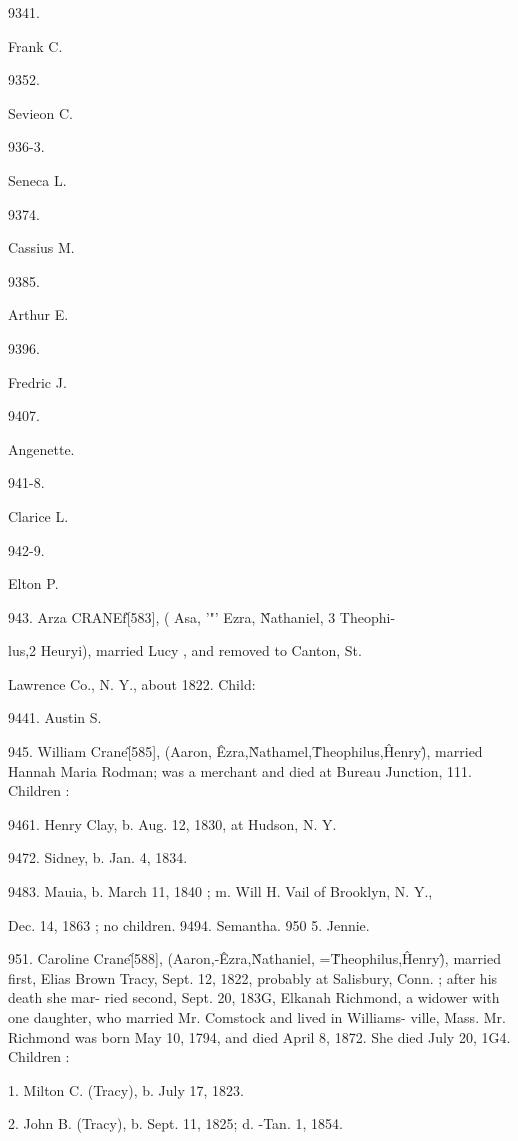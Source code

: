 9341. 


Frank C. 


9352. 


Sevieon C. 


936-3. 


Seneca L. 


9374. 


Cassius M. 


9385. 


Arthur E. 


9396. 


Fredric J. 


9407. 


Angenette. 


941-8. 


Clarice L. 


942-9. 


Elton P. 



943. Arza CRANEf\^ [583], ( Asa, '"' Ezra, \^ Nathaniel, 3 Theophi- 

lus,2 Heuryi), married Lucy , and removed to Canton, St. 

Lawrence Co., N. Y., about 1822. Child: 



9441. Austin S. 




945. William Crane\^ [585], (Aaron, \^ Ezra,\^ Nathamel,\^ 
Theophilus,\^ Henry\^), married Hannah Maria Rodman; was a 
merchant and died at Bureau Junction, 111. Children : 

9461. Henry Clay, b. Aug. 12, 1830, at Hudson, N. Y. 

9472. Sidney, b. Jan. 4, 1834. 

9483. Mauia, b. March 11, 1840 ; m. Will H. Vail of Brooklyn, N. Y., 

Dec. 14, 1863 ; no children. 
9494. Semantha. 
950  5. Jennie. 

951. Caroline Crane\^ [588], (Aaron,-\^ Ezra,\^ Nathaniel, =\^ 
Theophilus,\^ Henry\^), married first, Elias Brown Tracy, Sept. 
12, 1822, probably at Salisbury, Conn. ; after his death she mar- 
ried second, Sept. 20, 183G, Elkanah Richmond, a widower with 
one daughter, who married Mr. Comstock and lived in Williams- 
ville, Mass. Mr. Richmond was born May 10, 1794, and died 
April 8, 1872. She died July 20, 1G4. Children : 

1. Milton C. (Tracy), b. July 17, 1823. 

2. John B. (Tracy), b. Sept. 11, 1825; d. -Tan. 1, 1854. 


